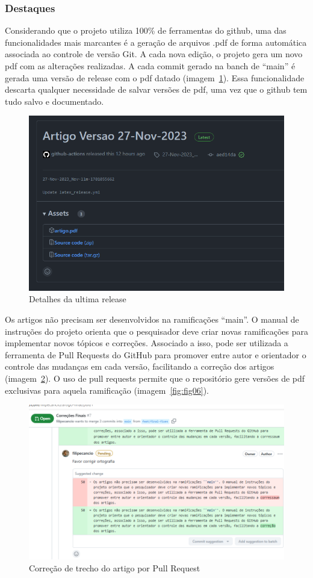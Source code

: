 
\subsubsection{Destaques}
Considerando que o projeto utiliza 100\% de ferramentas do github, uma das funcionalidades mais marcantes é a geração de arquivos .pdf de forma automática associada ao controle de versão Git. A cada nova edição, o projeto gera um novo pdf com as alterações realizadas. A cada commit gerado na banch de ``main'' é gerada uma versão de release com o pdf datado (imagem~\ref{fig:fig04}). Essa funcionalidade descarta qualquer necessidade de salvar versões de pdf, uma vez que o github tem tudo salvo e documentado.

\begin{figure}[ht]
	\centering
	\includegraphics[width=.6\textwidth]{./images/fig04.png}
	\caption{Detalhes da ultima release}
	\label{fig:fig04}
\end{figure}

Os artigos não precisam ser desenvolvidos na ramificações ``main''. O manual de instruções do projeto orienta que o pesquisador deve criar novas ramificações para implementar novos tópicos e correções. Associado a isso, pode ser utilizada a ferramenta de Pull Requests do GitHub para promover entre autor e orientador o controle das mudanças em cada versão, facilitando a correção dos artigos (imagem~\ref{fig:fig05}). O uso de pull requests permite que o repositório gere versões de pdf exclusivas para aquela ramificação (imagem~\ref{fig:fig06}).

\begin{figure}[ht]
	\centering
	\includegraphics[width=.6\textwidth]{./images/fig05.png}
	\caption{Correção de trecho do artigo por Pull Request}
	\label{fig:fig05}
\end{figure}

